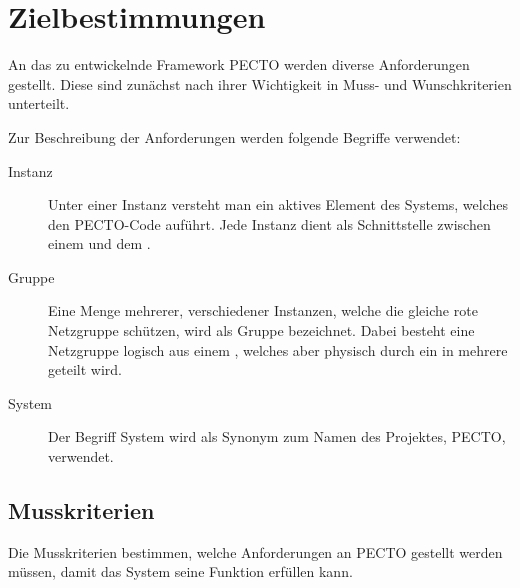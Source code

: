 \section{Zielbestimmungen}

An das zu entwickelnde Framework PECTO werden diverse Anforderungen gestellt.
Diese sind zunächst nach ihrer Wichtigkeit in Muss- und Wunschkriterien unterteilt. 

Zur Beschreibung der Anforderungen werden folgende Begriffe verwendet:
\begin{description}
	
	\item[Instanz] Unter einer Instanz versteht man ein aktives Element des Systems, welches den PECTO-Code auführt.
	Jede Instanz dient als Schnittstelle zwischen einem  und dem .
	
	\item[Gruppe] Eine Menge mehrerer, verschiedener Instanzen, welche die gleiche rote Netzgruppe schützen, wird als Gruppe bezeichnet.
	Dabei besteht eine Netzgruppe logisch aus einem , welches aber physisch durch ein  in mehrere  geteilt wird. 
		
	\item[System] Der Begriff System wird als Synonym zum Namen des Projektes, PECTO, verwendet.

\end{description}

\subsection{Musskriterien}
Die Musskriterien bestimmen, welche Anforderungen an PECTO gestellt werden müssen, damit das System seine Funktion erfüllen kann.


